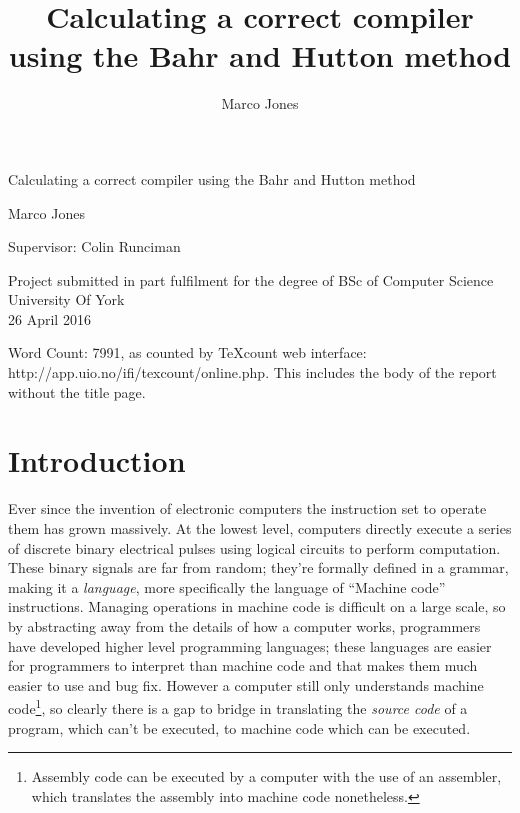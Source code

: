 \documentclass {article}
\title{Calculating a correct compiler using the Bahr and Hutton method}
\author{Marco Jones}
\begin{document}
\begin{titlepage}
    \begin{center}
        \vspace*{1cm}
        
        \Huge
         Calculating a correct compiler using the Bahr and Hutton method
        
        
        \vspace{2cm}
        \Large
        Marco Jones
        
       
        \vspace{1cm}
        \normalsize
        Supervisor: Colin Runciman
        
        \vspace{2.5cm}
        
                
        Project submitted in part fulfilment 
       for the degree of  BSc of  Computer Science \\

        \vspace{0.2cm}
   	University Of York\\
	\vspace{0.2cm}
 	26 April 2016
	
	\vspace{5cm}
	
	Word Count: 7991, as counted by TeXcount web interface:
	http://app.uio.no/ifi/texcount/online.php. 
	This includes the body of the report without the title page.
        
    \end{center}
\end{titlepage}

\tableofcontents
\clearpage

\newcommand{\BH}{Bahr and Hutton}
\newcommand{\vm}{virtual machine}

\section{Introduction}

Ever since the invention of electronic computers
the instruction set to operate them has grown massively.
At the lowest level, computers directly execute
a series of discrete binary electrical
pulses using logical circuits to perform computation.
These binary signals are far from random; they're formally
defined in a grammar, making it a \emph{language},
more specifically the language of ``Machine code'' instructions.
Managing operations in machine code is difficult on
a large scale,
so by abstracting away from the details of how a computer works,
 programmers have developed 
higher level programming languages;
these languages are easier for programmers to interpret
than machine code and that makes them much easier to use and bug fix.
However a computer still only understands machine code\footnote{
Assembly code can be executed by a computer 
with the use of an assembler,
which translates the assembly 
into machine code nonetheless.},
so clearly there is a gap to bridge in translating the 
\emph{source code} of a program, which can't be
executed, to machine code which can be executed.
\end{document}
